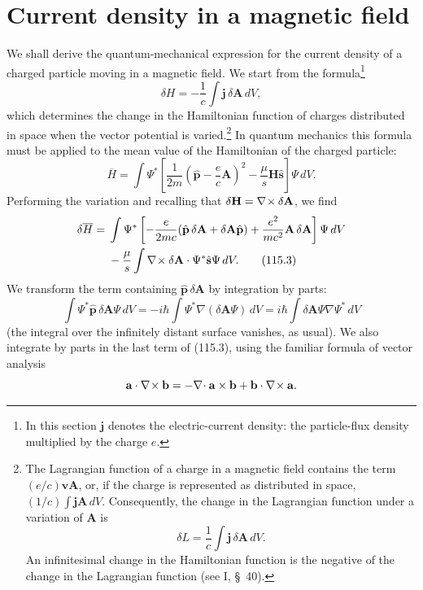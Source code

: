 \section{Current density in a magnetic field}

We shall derive the quantum-mechanical expression for the current density of a
charged particle moving in a magnetic field. We start from the formula\footnote{In
this section $\mathbf j$ denotes the electric-current density: the particle-flux
density multiplied by the charge $e$.}
\begin{equation}
 \delta H=-\frac1c\int\mathbf j\,\delta\mathbf A\,dV,
 \tag{115.1}
\end{equation}
which determines the change in the Hamiltonian function of charges distributed
in space when the vector potential is varied.\footnote{The Lagrangian function
of a charge in a magnetic field contains the term
$(e/c)\mathbf v\mathbf A$, or, if the charge is represented as distributed in
space, $(1/c)\int\mathbf j\mathbf A\,dV$. Consequently, the change in the
Lagrangian function under a variation of $\mathbf A$ is
\[
 \delta L=\frac1c\int\mathbf j\,\delta\mathbf A\,dV.
\]
An infinitesimal change in the Hamiltonian function is the negative of the
change in the Lagrangian function (see I, §~40).} In quantum mechanics this
formula must be applied to the mean value of the Hamiltonian of the charged
particle:
\begin{equation}
 \overline H=\int\Psi^*\left[
 \frac1{2m}\left(\hat{\mathbf p}-\frac ec\mathbf A\right)^2
 -\frac\mu s\mathbf H\hat{\mathbf s}\right]\Psi\,dV.
 \tag{115.2}
\end{equation}
Performing the variation and recalling that
$\delta\mathbf H=\nabla\!\times \delta\mathbf A$, we find
\begin{align}
 \delta\overline H={}&\int\Psi^*\left[-\frac e{2mc}
 (\hat{\mathbf p}\,\delta\mathbf A+\delta\mathbf A\hat{\mathbf p})
 +\frac{e^2}{mc^2}\mathbf A\,\delta\mathbf A\right]\Psi\,dV\notag\\
 &-\frac\mu s\int\nabla\!\times \delta\mathbf A\cdot
 \Psi^*\hat{\mathbf s}\Psi\,dV.
 \tag{115.3}
\end{align}
We transform the term containing $\hat{\mathbf p}\,\delta\mathbf A$ by
integration by parts:
\[
 \int\Psi^*\hat{\mathbf p}\,\delta\mathbf A\Psi\,dV
 =-i\hbar\int\Psi^*\nabla(\delta\mathbf A\Psi)\,dV
 =i\hbar\int\delta\mathbf A\Psi\nabla\Psi^*\,dV
\]
(the integral over the infinitely distant surface vanishes, as usual). We also
integrate by parts in the last term of (115.3), using the familiar formula of
vector analysis
\[
 \mathbf a\cdot\nabla\!\times \mathbf b
 =-\nabla\!\cdot \mathbf a\times\mathbf b
 +\mathbf b\cdot\nabla\!\times \mathbf a.
\]

